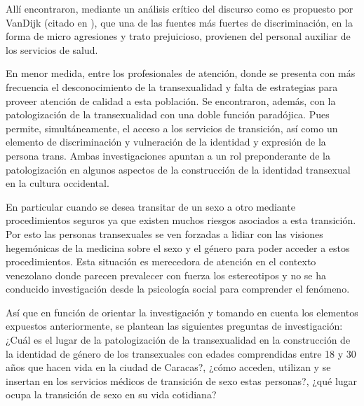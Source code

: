 Allí encontraron, mediante un análisis crítico del discurso como es propuesto
por VanDijk (citado en \cite[][p. 111]{LassoBaez2014}), que una de las fuentes más
fuertes de discriminación, en la forma de micro agresiones y trato prejuicioso,
provienen del personal auxiliar de los servicios de salud.

En menor medida, entre los profesionales de atención, donde se presenta con más
frecuencia el desconocimiento de la transexualidad y falta de estrategias para
proveer atención de calidad a esta población. Se encontraron, además, con la
patologización de la transexualidad con una doble función paradójica. Pues
permite, simultáneamente, el acceso a los servicios de transición, así como un
elemento de discriminación y vulneración de la identidad y expresión de la
persona trans. Ambas investigaciones apuntan a un rol preponderante de la
patologización en algunos aspectos de la construcción de la identidad transexual
en la cultura occidental.

En particular cuando se desea transitar de un sexo a otro mediante
procedimientos seguros ya que existen muchos riesgos asociados a esta
transición. Por esto las personas transexuales se ven forzadas a lidiar con las
visiones hegemónicas de la medicina sobre el sexo y el género para poder acceder
a estos procedimientos. Esta situación es merecedora de atención en el contexto
venezolano donde parecen prevalecer con fuerza los estereotipos y no se ha
conducido investigación desde la psicología social para comprender el fenómeno.

Así que en función de orientar la investigación y tomando en cuenta los
elementos expuestos anteriormente, se plantean las siguientes preguntas de
investigación: ¿Cuál es el lugar de la patologización de la transexualidad en la
construcción de la identidad de género de los transexuales con edades
comprendidas entre 18 y 30 años que hacen vida en la ciudad de Caracas?, ¿cómo
acceden, utilizan y se insertan en los servicios médicos de transición de sexo
estas personas?, ¿qué lugar ocupa la transición de sexo en su vida cotidiana?